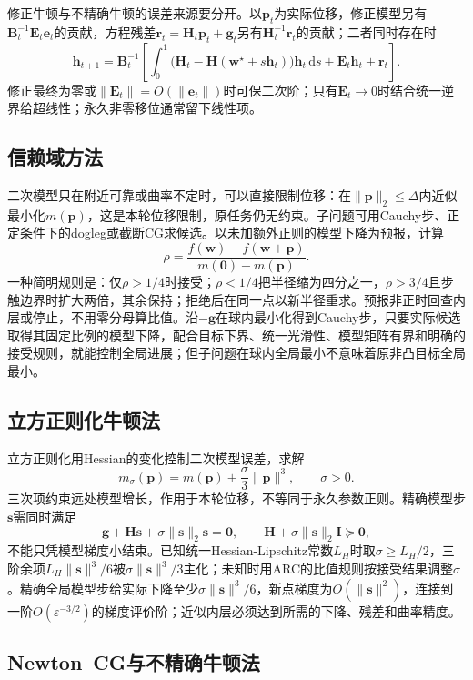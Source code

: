 修正牛顿与不精确牛顿的误差来源要分开。以$\bm p_t$为实际位移，修正模型另有$\bm B_t^{-1}\bm E_t\bm e_t$的贡献，方程残差$\bm r_t=\bm H_t\bm p_t+\bm g_t$另有$\bm H_t^{-1}\bm r_t$的贡献；二者同时存在时
\[
 \bm h_{t+1}=\bm B_t^{-1}\!\left[
 \int_0^1\bigl(\bm H_t-\bm H(\bm w^\star+s\bm h_t)\bigr)\bm h_t\,\mathrm ds
 +\bm E_t\bm h_t+\bm r_t\right].
\]
修正最终为零或$\|\bm E_t\|=O(\|\bm e_t\|)$时可保二次阶；只有$\bm E_t\to0$时结合统一逆界给超线性；永久非零移位通常留下线性项。

\subsection{信赖域方法}

二次模型只在附近可靠或曲率不定时，可以直接限制位移：在$\|\bm p\|_2\leq\Delta$内近似最小化$m(\bm p)$，这是本轮位移限制，原任务仍无约束。子问题可用Cauchy步、正定条件下的dogleg或截断CG求候选。以未加额外正则的模型下降为预报，计算
\begin{equation}
 \rho=\frac{f(\bm w)-f(\bm w+\bm p)}{m(\bm0)-m(\bm p)}.
 \label{eq:opt-trust-ratio}
\end{equation}
一种简明规则是：仅$\rho>1/4$时接受；$\rho<1/4$把半径缩为四分之一，$\rho>3/4$且步触边界时扩大两倍，其余保持；拒绝后在同一点以新半径重求。预报非正时回查内层或停止，不用零分母算比值。沿$-\bm g$在球内最小化得到Cauchy步，只要实际候选取得其固定比例的模型下降，配合目标下界、统一光滑性、模型矩阵有界和明确的接受规则，就能控制全局进展；但子问题在球内全局最小不意味着原非凸目标全局最小。

\subsection{立方正则化牛顿法}

立方正则化用Hessian的变化控制二次模型误差，求解
\[
 m_\sigma(\bm p)=m(\bm p)+\frac{\sigma}{3}\|\bm p\|^3,\qquad \sigma>0.
\]
三次项约束远处模型增长，作用于本轮位移，不等同于永久参数正则。精确模型步$\bm s$需同时满足
\[
 \bm g+\bm H\bm s+\sigma\|\bm s\|_2\bm s=\bm0,\qquad
 \bm H+\sigma\|\bm s\|_2\bm I\succeq\bm0,
\]
不能只凭模型梯度小结束。已知统一Hessian-Lipschitz常数$L_H$时取$\sigma\geq L_H/2$，三阶余项$L_H\|\bm s\|^3/6$被$\sigma\|\bm s\|^3/3$主化；未知时用ARC的比值规则按接受结果调整$\sigma$。精确全局模型步给实际下降至少$\sigma\|\bm s\|^3/6$，新点梯度为$O(\|\bm s\|^2)$，连接到一阶$O(\varepsilon^{-3/2})$的梯度评价阶；近似内层必须达到所需的下降、残差和曲率精度。

\subsection{Newton--CG与不精确牛顿法}

